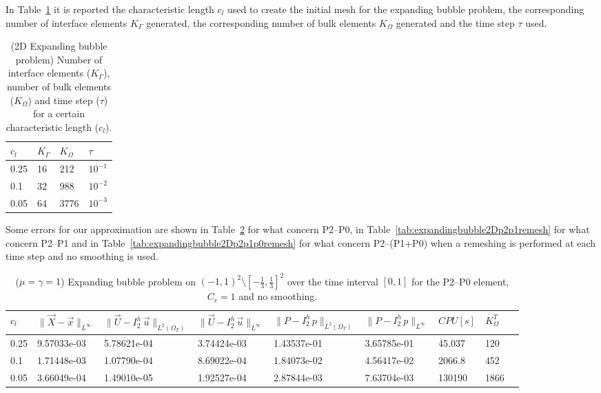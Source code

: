 \documentclass[a4paper,12pt,onecolumn]{article}
\newcommand{\errorXx}{\|\vec{X} - \vec{x}\|_{L^\infty}}
\newcommand{\LerrorUu}[1]{\|\vec U - I^h_{#1}\,\vec u\|_{L^2(\Omega_T)}}
\newcommand{\errorUu}[1]{\|\vec U - I^h_{#1}\,\vec u\|_{L^\infty}}
\newcommand{\errorPp}[1]{\|P - I^h_{#1}\,p\|_{L^\infty}}
\newcommand{\LerrorPp}[1]{\|P - I^h_{#1}\,p\|_{L^2(\Omega_T)}}
\begin{document}
In Table~\ref{tab:expandingbubble2Delements} it is reported the characteristic length $c_l$ used to create the initial mesh for the expanding bubble problem, the corresponding number of interface elements $K_\Gamma$ generated, the corresponding number of bulk elements $K_\Omega$ generated and the time step $\tau$ used. 
\begin{table}
 \center
\begin{tabular}{llll}
\hline
$c_l$ & $K_\Gamma$ & $K_\Omega$ & $\tau$\\
\hline
0.25 & 16 & 212 & $10^{-1}$ \\
0.1 & 32 & 988 & $10^{-2}$ \\
0.05 & 64 & 3776 & $10^{-3}$ \\
\hline
\end{tabular}
\caption{(2D Expanding bubble problem) Number of interface elements ($K_\Gamma$), number of bulk elements ($K_\Omega$) and time step ($\tau$) for a certain characteristic length ($c_l$).}
\label{tab:expandingbubble2Delements}
\end{table}

Some errors for our approximation are shown in Table~\ref{tab:expandingbubble2Dp2p0remesh} for what concern P2--P0, in Table~\ref{tab:expandingbubble2Dp2p1remesh} for what concern P2--P1 and in Table~\ref{tab:expandingbubble2Dp2p1p0remesh} for what concern P2--(P1+P0)  when a remeshing is performed at each time step and no smoothing is used.

\begin{table}
 \center
 \hspace*{-2cm}
\begin{tabular}{lllllllll}
\hline
$c_l$ & $\errorXx$ & $\LerrorUu2$ & $\errorUu2$ & $\LerrorPp2$ & $\errorPp2$ & $CPU[s]$ & $K_\Omega^T$\\
\hline
0.25 & 9.57033e-03 & 5.78621e-04 & 3.74424e-03 & 1.43537e-01 & 3.65785e-01 & 45.037 & 120\\
0.1 &  1.71448e-03 & 1.07790e-04 & 8.69022e-04 & 1.84073e-02 & 4.56417e-02 & 2066.8 & 452\\
0.05 & 3.66049e-04 & 1.49010e-05 & 1.92527e-04 & 2.87844e-03 & 7.63704e-03 & 130190 & 1866\\ 
\hline
\end{tabular}
\hspace*{-2cm}
\caption{($\mu=\gamma=1$) Expanding bubble problem on $(-1,1)^2\setminus[-\frac{1}{3},\frac{1}{3}]^2$ over the time interval $[0,1]$ for the P2--P0 element, $C_r=1$ and no smoothing.}
\label{tab:expandingbubble2Dp2p0remesh}
\end{table}
\end{document}
